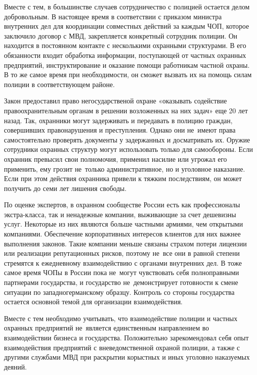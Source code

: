 \documentclass[a4paper,12pt,fleqn]{article} %
\begin{document}
Вместе с тем, в большинстве случаев сотрудничество с полицией остается делом добровольным. В настоящее время в соответствии с приказом министра внутренних дел для координации совместных действий за каждым ЧОП, которое заключило договор с МВД, закрепляется конкретный сотрудник полиции. Он находится в постоянном контакте с несколькими охранными структурами. В его обязанности входит обработка информации, поступающей от частных охранных предприятий, инструктирование и оказание помощи работникам частной охраны. В то же самое время при необходимости, он сможет вызвать их на помощь силам полиции в соответствующем районе.

Закон предоставил право негосударственой охране «оказывать содействие правоохранительным органам в решении возложенных на них задач» еще 20 лет назад. Так, охранники могут задерживать и передавать в полицию граждан, совершивших правонарушения и преступления. Однако они не~имеют права самостоятельно проверять документы у задержанных и досматривать их. Оружие сотрудники охранных структур могут использовать только для самообороны. Если охранник превысил свои полномочия, применил насилие или угрожал его применить, ему грозит не~только административное, но и уголовное наказание. Если при этом действия охранника привели к тяжким последствиям, он может получить до семи лет лишения свободы. 

По оценке экспертов, в охранном сообществе России есть как профессионалы экстра-класса, так и ненадежные компании, выживающие за счет дешевизны услуг. Некоторые из них являются больше частными армиями, чем открытыми компаниями. Обеспечение корпоративных интересов клиентов для них важнее выполнения законов. Такие компании меньше связаны страхом потери лицензии или реализации репутационных рисков, поэтому не~все они в равной степени стремятся к ежедневному взаимодействию с органами внутренних дел. В тоже самое время ЧОПы в России пока не~могут чувствовать себя полноправными партнерами государства, и государство не~демонстрирует готовности к смене ситуации по западногерманскому образцу. Контроль со стороны государства остается основной темой для организации взаимодействия.  

Вместе с тем необходимо учитывать, что взаимодействие полиции и частных охранных предприятий не~является единственным направлением во взаимодействии бизнеса и государства. Положительно зарекомендовал себя опыт взаимодействия предприятий с вневедомственной охраной полиции, а также с другими службами МВД при раскрытии корыстных и иных уголовно наказуемых деяний.\\
\end{document}

